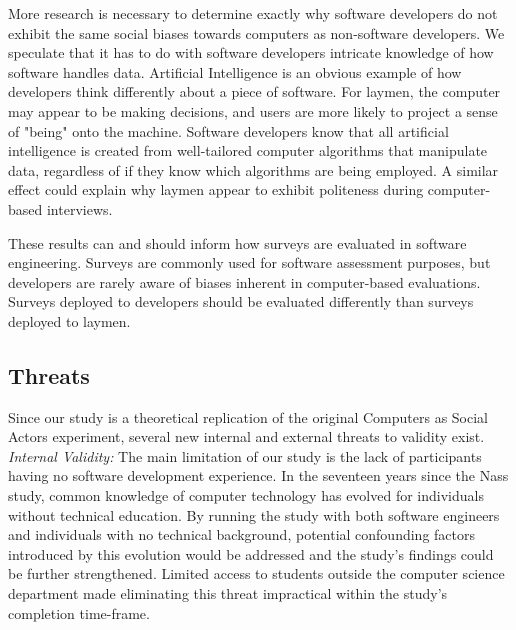 \documentclass{sig-alternate-05-2015}
\begin{document}

More research is necessary to determine exactly why software developers do not exhibit the same social biases towards computers as non-software developers.  We speculate that it has to do with software developers intricate knowledge of how software handles data.  Artificial Intelligence is an obvious example of how developers think differently about a piece of software.  For laymen, the computer may appear to be making decisions, and users are more likely to project a sense of "being" onto the machine.  Software developers know that all artificial intelligence is created from well-tailored computer algorithms that manipulate data, regardless of if they know which algorithms are being employed.  A similar effect could explain why laymen appear to exhibit politeness during computer-based interviews.  

These results can and should inform how surveys are evaluated in software engineering.  Surveys are commonly used for software assessment purposes, but developers are rarely aware of biases inherent in computer-based evaluations.  Surveys deployed to developers should be evaluated differently than surveys deployed to laymen.  
\subsection{Threats}

Since our study is a theoretical replication of the original Computers as Social Actors experiment, several new internal and external threats to validity exist.\\

\emph{Internal Validity:} The main limitation of our study is the lack of participants having no software development experience. In the seventeen years since the Nass study, common knowledge of computer technology has evolved for individuals without technical education. By running the study with both software engineers and individuals with no technical background, potential confounding factors introduced by this evolution would be addressed and the study's findings could be further strengthened. Limited access to students outside the computer science department made eliminating this threat impractical within the study's completion time-frame. 
\end{document}
